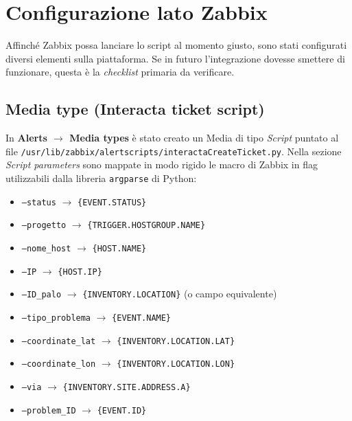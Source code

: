 \documentclass[12pt, a4paper]{report}
\begin{document}
\section{Configurazione lato Zabbix}
Affinché Zabbix possa lanciare lo script al momento giusto, 
sono stati configurati diversi elementi sulla piattaforma. 
Se in futuro l'integrazione dovesse smettere di funzionare, questa è la \textit{checklist} primaria da verificare.

\subsection{Media type (Interacta ticket script)}
In \textbf{Alerts $\rightarrow$ Media types} è stato creato un Media di tipo \textit{Script} 
puntato al file \texttt{/usr/lib/zabbix/alertscripts/interactaCreateTicket.py}.
Nella sezione \textit{Script parameters} sono mappate in modo rigido le macro di Zabbix in flag
utilizzabili dalla libreria \texttt{argparse} di Python:
\begin{itemize}
    \item \texttt{--status} $\rightarrow$ \texttt{\{EVENT.STATUS\}}
    \item \texttt{--progetto} $\rightarrow$ \texttt{\{TRIGGER.HOSTGROUP.NAME\}}
    \item \texttt{--nome\_host} $\rightarrow$ \texttt{\{HOST.NAME\}}
    \item \texttt{--IP} $\rightarrow$ \texttt{\{HOST.IP\}}
    \item \texttt{--ID\_palo} $\rightarrow$ \texttt{\{INVENTORY.LOCATION\}} (o campo equivalente)
    \item \texttt{--tipo\_problema} $\rightarrow$ \texttt{\{EVENT.NAME\}}
    \item \texttt{--coordinate\_lat} $\rightarrow$ \texttt{\{INVENTORY.LOCATION.LAT\}}
    \item \texttt{--coordinate\_lon} $\rightarrow$ \texttt{\{INVENTORY.LOCATION.LON\}}
    \item \texttt{--via} $\rightarrow$ \texttt{\{INVENTORY.SITE.ADDRESS.A\}}
    \item \texttt{--problem\_ID} $\rightarrow$ \texttt{\{EVENT.ID\}}
\end{itemize}

\end{document}

